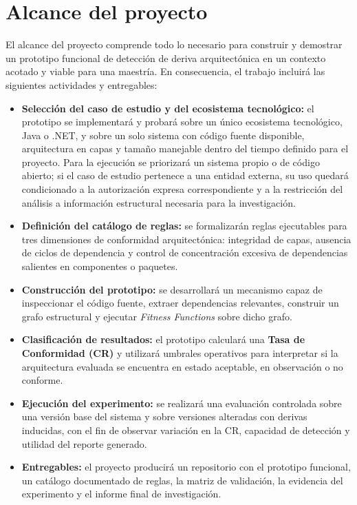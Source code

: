 \section{Alcance del proyecto}

El alcance del proyecto comprende todo lo necesario para construir y demostrar un prototipo funcional de detección de deriva arquitectónica en un contexto acotado y viable para una maestría. En consecuencia, el trabajo incluirá las siguientes actividades y entregables:

\begin{itemize}
  \item \textbf{Selección del caso de estudio y del ecosistema tecnológico:} el prototipo se implementará y probará sobre un único ecosistema tecnológico, Java o .NET, y sobre un solo sistema con código fuente disponible, arquitectura en capas y tamaño manejable dentro del tiempo definido para el proyecto. Para la ejecución se priorizará un sistema propio o de código abierto; si el caso de estudio pertenece a una entidad externa, su uso quedará condicionado a la autorización expresa correspondiente y a la restricción del análisis a información estructural necesaria para la investigación.
  \item \textbf{Definición del catálogo de reglas:} se formalizarán reglas ejecutables para tres dimensiones de conformidad arquitectónica: integridad de capas, ausencia de ciclos de dependencia y control de concentración excesiva de dependencias salientes en componentes o paquetes.
  \item \textbf{Construcción del prototipo:} se desarrollará un mecanismo capaz de inspeccionar el código fuente, extraer dependencias relevantes, construir un grafo estructural y ejecutar \textit{Fitness Functions} sobre dicho grafo.
  \item \textbf{Clasificación de resultados:} el prototipo calculará una \textbf{Tasa de Conformidad (CR)} y utilizará umbrales operativos para interpretar si la arquitectura evaluada se encuentra en estado aceptable, en observación o no conforme.
  \item \textbf{Ejecución del experimento:} se realizará una evaluación controlada sobre una versión base del sistema y sobre versiones alteradas con derivas inducidas, con el fin de observar variación en la CR, capacidad de detección y utilidad del reporte generado.
  \item \textbf{Entregables:} el proyecto producirá un repositorio con el prototipo funcional, un catálogo documentado de reglas, la matriz de validación, la evidencia del experimento y el informe final de investigación.
\end{itemize}

